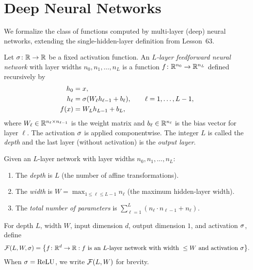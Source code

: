\documentclass[11pt,a4paper]{article}
\begin{document}
\section{Deep Neural Networks}
\label{sec:deep-networks}

We formalize the class of functions computed by multi-layer
(deep) neural networks, extending the single-hidden-layer definition
from Lesson~63.

\begin{definition}
\label{def:deep-network}
Let $\sigma \colon \mathbb{R} \to \mathbb{R}$ be a fixed activation function.  An
\emph{$L$-layer feedforward neural network} with layer widths
$n_0, n_1, \ldots, n_L$ is a function
$f \colon \mathbb{R}^{n_0} \to \mathbb{R}^{n_L}$ defined recursively by
\begin{align}
  h_0 &= x, \notag \\
  h_\ell &= \sigma(W_\ell h_{\ell-1} + b_\ell),
    \qquad \ell = 1, \ldots, L-1, \label{eq:hidden-layers} \\
  f(x) &= W_L h_{L-1} + b_L, \notag
\end{align}
where $W_\ell \in \mathbb{R}^{n_\ell \times n_{\ell-1}}$ is the weight matrix
and $b_\ell \in \mathbb{R}^{n_\ell}$ is the bias vector for layer $\ell$.
The activation $\sigma$ is applied componentwise.  The integer $L$
is called the \emph{depth} and the last layer (without activation) is
the \emph{output layer}.
\end{definition}

\begin{definition}
\label{def:width-depth}
Given an $L$-layer network with layer widths $n_0, n_1, \ldots, n_L$:
\begin{enumerate}[nosep,label=(\roman*)]
  \item The \emph{depth} is $L$ (the number of affine transformations).
  \item The \emph{width} is $W = \max_{1 \le \ell \le L-1} n_\ell$
    (the maximum hidden-layer width).
  \item The \emph{total number of parameters} is
    $\sum_{\ell=1}^{L} (n_\ell \cdot n_{\ell-1} + n_\ell)$.
\end{enumerate}
\end{definition}

\begin{definition}
\label{def:function-class}
For depth $L$, width $W$, input dimension $d$, output dimension $1$,
and activation $\sigma$, define
\[
  \mathcal{F}(L, W, \sigma) = \bigl\{ f \colon \mathbb{R}^d \to \mathbb{R} :
  f \text{ is an $L$-layer network with width } \le W
  \text{ and activation } \sigma \bigr\}.
\]
When $\sigma = \text{ReLU}$, we write $\mathcal{F}(L, W)$ for brevity.
\end{definition}
\end{document}
